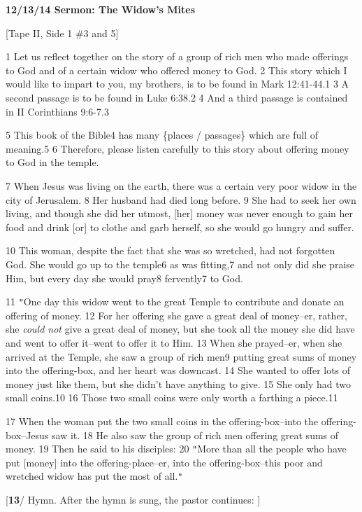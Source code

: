 
\textbf{12/13/14 Sermon: The Widow's Mites}

[Tape II, Side 1 \#3 and 5]

1 Let us reflect together on the story of a group of rich men who made offerings
to God and of a certain widow who offered money to God. 2 This story which I would
like to impart to you, my brothers, is to be found in Mark 12:41-44.1 3 A second
passage is to be found in Luke 6:38.2 4 And a third passage is contained in II
Corinthians 9:6-7.3

5 This book of the Bible4 has many \{places / passages\} which are full of meaning.5
6 Therefore, please listen carefully to this story about offering money to God
in the temple.

7 When Jesus was living on the earth, there was a certain very poor widow in the
city of Jerusalem. 8 Her husband had died long before. 9 She had to seek her own
living, and though she did her utmost, [her] money was never enough to gain her
food and drink [or] to clothe and garb herself, so she would go hungry and suffer.

10 This woman, despite the fact that she was so wretched, had not forgotten God.
She would go up to the temple6 as was fitting,7 and not only did she praise Him,
but every day she would pray8 fervently7 to God.

11 \texttt{"}One day this widow went to the great Temple to contribute and donate
an offering of money. 12 For her offering she gave a great deal of money--er, rather,
she \textit{could not} give a great deal of money, but she took all the money she
did have and went to offer it--went to offer it to Him. 13 When she prayed--er,
when she arrived at the Temple, she saw a group of rich men9 putting great sums
of money into the offering-box, and her heart was downcast. 14 She wanted to offer
lots of money just like them, but she didn't have anything to give. 15 She only
had two small coins.10 16 Those two small coins were only worth a farthing a piece.11

17 When the woman put the two small coins in the offering-box--into the offering-box--Jesus
saw it. 18 He also saw the group of rich men offering great sums of money. 19 Then
he said to his disciples: 20 \texttt{"}More than all the people who have put [money]
into the offering-place--er, into the offering-box--this poor and wretched widow
has put the most of all.\texttt{"}

[\textbf{13}/ Hymn. After the hymn is sung, the pastor continues: ]

